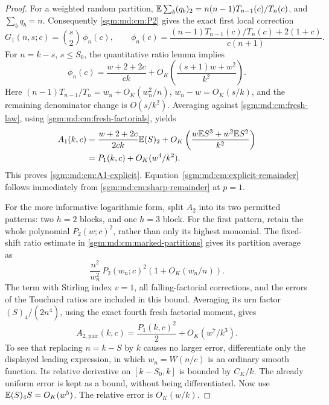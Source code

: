 \documentclass[11pt,letterpaper]{article}
\theoremstyle{remark}\newtheorem{remark}[theorem]{Remark}
\newcommand{\fall}[2]{(#1)_{#2}}\newcommand{\rise}[2]{#1^{\overline{#2}}}
\theoremstyle{definition}\newtheorem{definition}[theorem]{Definition}
\begin{document}
\begin{proof}
For a weighted random partition,
\(\E\sum_b\fall{q_b}{2}
=n(n-1)T_{n-1}(c)/T_n(c)\), and \(\sum_bq_b=n\).
Consequently \eqref{sgm:md:cm:P2} gives the exact first local correction
\begin{equation}\label{sgm:md:cm:G1}
 G_1(n,s;c)=\binom s2\,\phi_n(c),\qquad
 \phi_n(c)=
 \frac{(n-1)T_{n-1}(c)/T_n(c)+2(1+c)}{c(n+1)}.
\end{equation}
For \(n=k-s\), \(s\le S_0\), the quantitative ratio lemma implies
\[
 \phi_n(c)=\frac{w+2+2c}{ck}
       +O_K\left(\frac{(s+1)w+w^2}{k^2}\right).
\]
Here \((n-1)T_{n-1}/T_n=w_n+O_K(w_n^2/n)\),
\(w_n-w=O_K(s/k)\), and the remaining denominator change is
\(O(s/k^2)\).
Averaging against \eqref{sgm:md:cm:fresh-law}, using
\eqref{sgm:md:cm:fresh-factorials}, yields
\begin{align*}
 A_1(k,c)
 &=\frac{w+2+2c}{2ck}\E\fall{S}{2}
   +O_K\left(\frac{w\E S^3+w^2\E S^2}{k^2}\right)\\
 &=P_1(k,c)+O_K(w^4/k^2).
\end{align*}
This proves \eqref{sgm:md:cm:A1-explicit}.
Equation~\eqref{sgm:md:cm:explicit-remainder} follows immediately from
\eqref{sgm:md:cm:sharp-remainder} at \(p=1\).

For the more informative logarithmic form, split \(A_2\) into its
two permitted patterns: two \(h=2\) blocks, and one \(h=3\) block.
For the first pattern, retain the whole polynomial \(P_2(w;c)^2\),
rather than only its highest monomial.
The fixed-shift ratio estimate in
\eqref{sgm:md:cm:marked-partitions} gives its partition average as
\[
 \frac{n^2}{w_n^2}\,P_2(w_n;c)^2
       \left(1+O_K(w_n/n)\right).
\]
The term with Stirling index \(v=1\), all falling-factorial
corrections, and the errors of the Touchard ratios are included
in this bound. Averaging its urn factor
\(\fall{S}{4}/(2\rise{n}{4})\), using the exact fourth fresh
factorial moment, gives
\begin{equation}\label{sgm:md:cm:pair-cancel}
 A_{2,\mathrm{pair}}(k,c)
 =\frac{P_1(k,c)^2}{2}+O_K(w^7/k^3).
\end{equation}
To see that replacing \(n=k-S\) by \(k\) causes no larger error,
differentiate only the displayed leading expression, in which
\(w_n=W(n/c)\) is an ordinary smooth function. Its relative
derivative on \([k-S_0,k]\) is bounded by \(C_K/k\).
The already uniform error is kept as a bound, without being
differentiated. Now use
\(\E\fall{S}{4}S=O_K(w^5)\). The relative error is \(O_K(w/k)\).


\end{proof}
\end{document}
